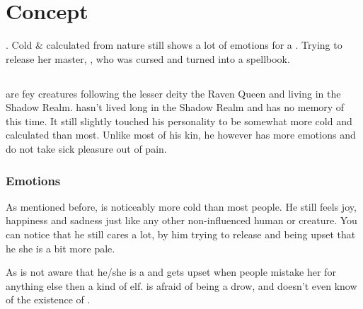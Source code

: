 \ifdm
    \chapter{Concept}
    \label{concept}

     \Race{}. Cold \& calculated from nature \Name{} still shows a lot of emotions for a \Race. Trying to release her master, \MasterFullName{}, who was cursed and turned into a spellbook.

    \section{\Race{}} 
    \Race{} are fey creatures following the lesser deity the Raven Queen and living in the Shadow Realm. \Name{} hasn't lived long in the Shadow Realm and has no memory of this time. It still slightly touched his personality to be somewhat more cold and calculated than most. Unlike most of his kin, he however has more emotions and do not take sick pleasure out of pain.

    \subsection{Emotions}
    As mentioned before, \Name{} is noticeably more cold than most people. He still feels joy, happiness and sadness just like any other non-influenced human or creature. You can notice that he still cares a lot, by him trying to release \Master{} and being upset that he she is a bit more pale.

    As \Name{} is not aware that he/she is a \Race{} and gets upset when people mistake her for anything else then a kind of elf. \Name{} is afraid of being a drow, and doesn't even know of the existence of \Race{}.

